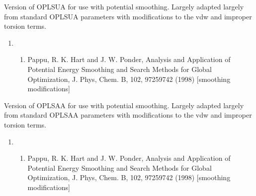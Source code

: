 \documentclass[letterpaper,11pt,english]{sphinxmanual}
\begin{document}

Version of OPLS\sphinxhyphen{}UA for use with potential smoothing. Largely adapted largely from standard OPLS\sphinxhyphen{}UA parameters with modifications to the vdw and improper torsion terms.
\begin{enumerate}
%
\setcounter{enumi}{17}
\item {} \begin{enumerate}
%
\setcounter{enumii}{21}
\item {} 
Pappu, R. K. Hart and J. W. Ponder, Analysis and Application of Potential Energy Smoothing and Search Methods for Global Optimization, J. Phys, Chem. B, 102, 9725\sphinxhyphen{}9742 (1998)  {[}smoothing modifications{]}

\end{enumerate}

\end{enumerate}


Version of OPLS\sphinxhyphen{}AA for use with potential smoothing. Largely adapted largely from standard OPLS\sphinxhyphen{}AA parameters with modifications to the vdw and improper torsion terms.
\begin{enumerate}
%
\setcounter{enumi}{17}
\item {} \begin{enumerate}
%
\setcounter{enumii}{21}
\item {} 
Pappu, R. K. Hart and J. W. Ponder, Analysis and Application of Potential Energy Smoothing and Search Methods for Global Optimization, J. Phys, Chem. B, 102, 9725\sphinxhyphen{}9742 (1998)  {[}smoothing modifications{]}

\end{enumerate}

\end{enumerate}

\end{document}
